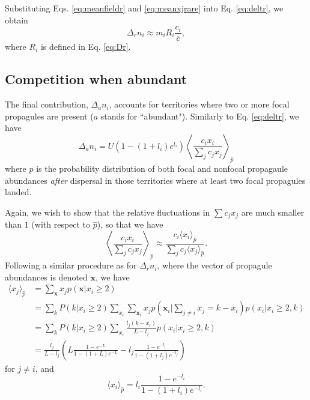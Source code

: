 \documentclass[11pt]{article}
\begin{document}
Substituting Eqs. \eqref{eq:meanfieldr} and \eqref{eq:meanxjrare} into Eq. \eqref{eq:deltr}, we obtain
\begin{equation}
\Delta_r n_i\approx m_i R_i\frac{c_i}{\overline{c}}, \label{eq:deltrfinal}
\end{equation}
where $R_i$ is defined in Eq. \eqref{eq:Dr}.

\subsection*{Competition when abundant}

The final contribution, $\Delta_a n_i$, accounts for territories where two or more focal propagules are present ($a$ stands for ``abundant"). Similarly to Eq. \eqref{eq:deltr}, we have 
\begin{equation}
\Delta_a n_i=U(1-(1+l_i)e^{l_i})\left\langle \frac{c_i x_i}{\sum_j c_j x_j} \right\rangle_{\hat{p}}\label{eq:delta}
\end{equation}
where $\hat{p}$ is the probability distribution of both focal and nonfocal propagaule abundances \textit{after} dispersal in those territories where at least two focal propagules landed. 

Again, we wish to show that the relative fluctuations in $\sum c_j x_j$ are much smaller than $1$ (with respect to $\hat{p}$), so that we have 
\begin{equation}
\left\langle \frac{c_i x_i}{\sum_j c_j x_j} \right\rangle_{\hat{p}}\approx  \frac{c_i \langle x_i \rangle_{\hat{p}}}{\sum_j c_j \langle x_j\rangle_{\hat{p}}}.\label{eq:meanfielda}
\end{equation}
Following a similar procedure as for $\Delta_r n_i$, where the vector of propagule abundances is denoted ${\mathbf x}$, we have
\begin{align}
\langle x_j \rangle_{\hat{p}}&=\sum_{\mathbf x} x_j p(\mathbf x|x_i\geq 2)\nonumber \\
&=\sum_{k}P(k|x_i\geq 2)\sum_{x_i} \sum_{\mathbf x_i} x_j p(\mathbf x_i|\sum_{j\neq i} x_j=k-x_i)p(x_i|x_i\geq 2,k)\nonumber\\
&=\sum_{k}P(k|x_i\geq 2)\sum_{x_i} \frac{l_j(k-x_i)}{L-l_j} p(x_i|x_i\geq 2,k)\nonumber\\
&=\frac{l_j}{L-l_j}\left( L\frac{1-e^{-L}}{1-(1+L)e^{-L}}- l_j\frac{1-e^{-l_j}}{1-(1+l_j)e^{-l_j}}\right) 
\end{align}
for $j\neq i$, and 
\begin{equation}
\langle x_i\rangle_{\hat{p}}=l_i\frac{1-e^{-l_i}}{1-(1+l_i)e^{-l_i}}.
\end{equation}
\end{document}
